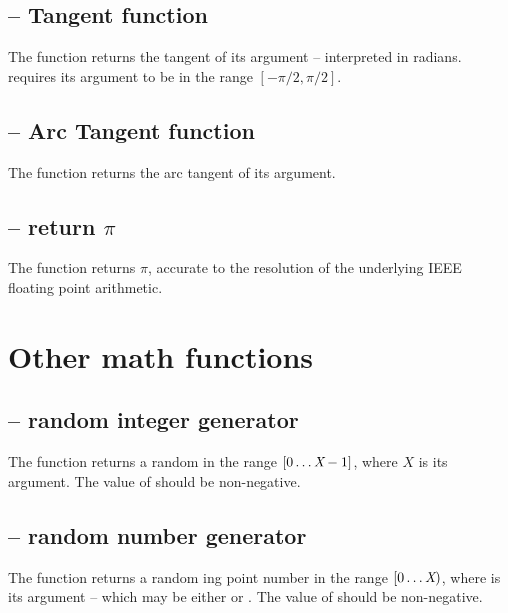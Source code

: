 \subsection{ -- Tangent function}
\label{arith:tan}
The  function returns the tangent of its argument -- interpreted in radians.   requires its argument to be in the range $[-\pi/2,\pi/2]$.
  
\subsection{ -- Arc Tangent function}
\label{arith:atan}
     
The  function returns the arc tangent of its argument.

\subsection{ -- return \texorpdfstring{$\pi$}{pi}}
\label{arith:pi}

The  function returns $\pi$, accurate to the resolution of the underlying IEEE floating point arithmetic.

\section{Other math functions}
\label{arith:other}


\subsection{ -- random integer generator}
\label{arith:irand}

The  function returns a random  in the range $[0\ldots{\mbox{\rm\em X}}-1]$, where $X$ is its argument. The value of  should be non-negative.

\subsection{ -- random number generator}
\label{arith:rand}

The  function returns a random ing point number in the range $[0\ldots{\mbox{\rm\em X}})$, where  is its argument -- which may be either  or . The value of  should be non-negative.

